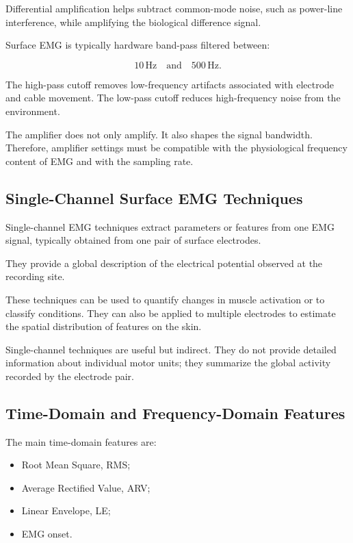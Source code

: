 Differential amplification helps subtract common-mode noise, such as power-line interference, while amplifying the biological difference signal.

Surface EMG is typically hardware band-pass filtered between:

\[
10\,\text{Hz}
\quad \text{and} \quad
500\,\text{Hz}.
\]

The high-pass cutoff removes low-frequency artifacts associated with electrode and cable movement. The low-pass cutoff reduces high-frequency noise from the environment.

\begin{authornote}
The amplifier does not only amplify. It also shapes the signal bandwidth. Therefore, amplifier settings must be compatible with the physiological frequency content of EMG and with the sampling rate.
\end{authornote}

\subsection{Single-Channel Surface EMG Techniques}

Single-channel EMG techniques extract parameters or features from one EMG signal, typically obtained from one pair of surface electrodes.

They provide a global description of the electrical potential observed at the recording site.

These techniques can be used to quantify changes in muscle activation or to classify conditions. They can also be applied to multiple electrodes to estimate the spatial distribution of features on the skin.

\begin{authornote}
Single-channel techniques are useful but indirect. They do not provide detailed information about individual motor units; they summarize the global activity recorded by the electrode pair.
\end{authornote}

\subsection{Time-Domain and Frequency-Domain Features}

The main time-domain features are:

\begin{itemize}[noitemsep]
    \item Root Mean Square, RMS;
    \item Average Rectified Value, ARV;
    \item Linear Envelope, LE;
    \item EMG onset.
\end{itemize}

